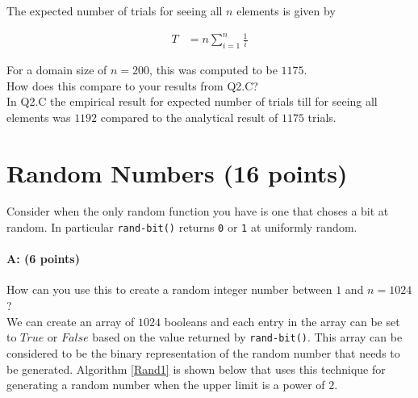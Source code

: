 \documentclass[11pt]{article}
\begin{document}
The expected number of trials for seeing all $n$ elements is given by

\begin{equation*}
\begin{aligned}
T&= n \sum_{i=1}^n \frac{1}{i}
\end{aligned}
\end{equation*}

For a domain size of $n=200$, this was computed to be $1175$.\\

How does this compare to your results from \textsf{Q2.C}?\\

In \textsf{Q2.C} the empirical result for expected number of trials till for seeing all elements was $1192$ compared to the analytical result of $1175$ trials.

\section{Random Numbers (16 points)}

Consider when the only random function you have is one that choses a bit at random.  In particular \texttt{rand-bit()} returns \texttt{0} or \texttt{1} at uniformly random.  

\paragraph{A: (6 points)}
How can you use this to create a random integer number between $1$ and $n=1024$?  \\

We can create an array of $1024$ booleans and each entry in the array can be set to $True$ or $False$ based on the value returned by \texttt{rand-bit()}. This array can be considered to be the binary representation of the random number that needs to be generated. Algorithm \ref{Rand1} is shown below that uses this technique for generating a random number when the upper limit is a power of $2$.\\
\end{document}
